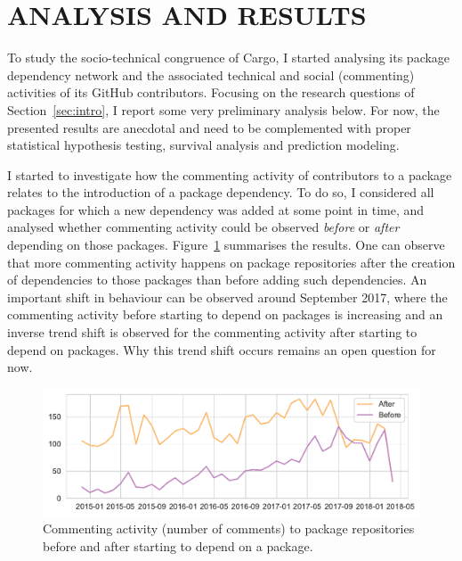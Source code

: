 \section{ANALYSIS AND RESULTS}

To study the socio-technical congruence of Cargo, I started analysing its package dependency network and the associated technical and social (commenting) activities of its GitHub contributors.
Focusing on the research questions of Section~\ref{sec:intro}, I report some very preliminary analysis below.
For now, the presented results are anecdotal and need to be complemented with proper statistical hypothesis testing, survival analysis and prediction modeling.

I started to investigate how the commenting activity of contributors to a package relates to the introduction of a package dependency.
To do so, I considered all packages for which a new dependency was added at some point in time, and analysed whether commenting activity could be observed \emph{before} or \emph{after} depending on those packages.
Figure~\ref{fig:fig1} summarises the results. One can observe that more commenting activity happens on package repositories after the creation of dependencies to those packages than before adding such dependencies. 
An important shift in behaviour can be observed around September 2017, where the commenting activity before starting to depend on packages is increasing and an inverse trend shift is observed for the commenting activity after starting to depend on packages. Why this trend shift occurs remains an open question for now.

\begin{figure}[thb]
\vspace{-0.3cm}
    \includegraphics[width=0.9\columnwidth]{Photos/RQ21.pdf} 
    \caption{Commenting activity (number of comments) to package repositories before and after starting to depend on a package.}
    \label{fig:fig1}
\end{figure}

